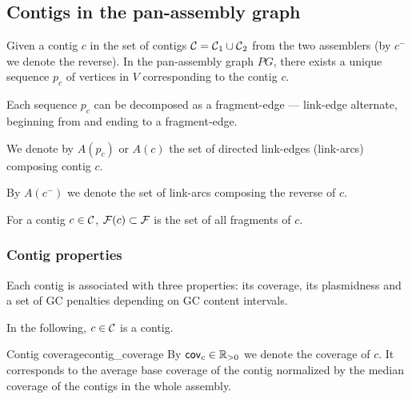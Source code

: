 \subsection{Contigs in the pan-assembly graph}

Given a contig \(c\) in the set of contigs \(\mathcal{C}{} = \mathcal{C}{}_1 \cup \mathcal{C}{}_2\) from the two assemblers (by \(c^-\) we denote the reverse).
In the pan-assembly graph \(PG\), there exists a unique sequence \(p_c\) of vertices in \(V\) corresponding to the contig \(c\).

\begin{notebox}
  Each sequence \(p_c\) can be decomposed as a fragment-edge --- link-edge alternate, beginning from and ending to a fragment-edge.
\end{notebox}

We denote by \(A(p_c)\) or \(A(c)\) the set of directed link-edges (link-arcs) composing contig \(c\).

\begin{notebox}
  By \(A(c^-)\) we denote the set of link-arcs composing the reverse of \(c\).
\end{notebox}

For a contig \(c \in \mathcal{C}{}\), \(\mathcal{F}{}(c) \subset \mathcal{F}{}\) is the set of all fragments of \(c\).

\subsubsection{Contig properties}

Each contig is associated with three properties: its coverage, its plasmidness and a set of GC penalties depending on GC content intervals.

In the following, \(c \in \mathcal{C}{}\) is a contig.

\begin{definition}{Contig coverage}{contig_coverage}
  By \(\mathsf{cov}_{c} \in \mathbb{R}_{>0}\) we denote the coverage of \(c\).
  It corresponds to the average base coverage of the contig normalized by the median coverage of the contigs in the whole assembly.
\end{definition}

